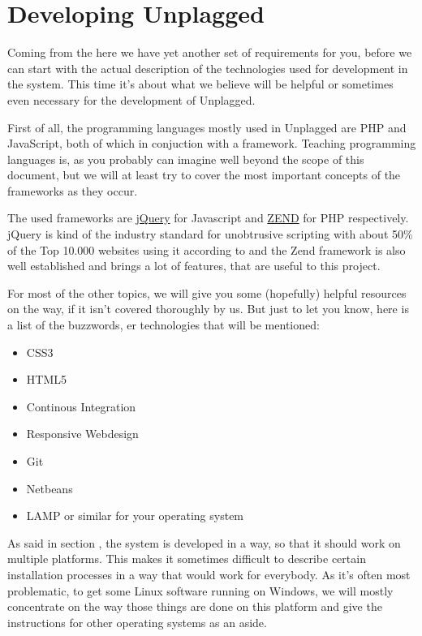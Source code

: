 \chapter{Developing Unplagged}\label{chap:developingUnplagged}

Coming from the  here we have yet another set of requirements for you, before we can
start with the actual description of the technologies used for development in the system. This time it's 
about what we believe will be helpful or sometimes even necessary for the development of Unplagged. 

First of all, the programming languages mostly used in Unplagged are PHP and JavaScript, both of which in conjuction
with a framework. Teaching programming languages is, as you probably can imagine well beyond the scope of this document,
but we will at least try to cover the most important concepts of the frameworks as they occur. 

The used frameworks are 
\href{http://jquery.com/}{jQuery} for Javascript and \href{http://framework.zend.com/docs/overview}{ZEND} for PHP 
respectively. jQuery is kind of the industry standard for unobtrusive scripting with about 50\% 
of the Top 10.000 websites using it according to \citet*{Trends} and the Zend framework is also well established and
brings a lot of features, that are useful to this project.

For most of the other topics, we will give you some (hopefully) helpful resources on the way, if it isn't covered 
thoroughly by us. But just to let you
know, here is a list of the buzzwords, er technologies that will be mentioned:

\begin{itemize}
\item CSS3
\item HTML5
\item Continous Integration
\item Responsive Webdesign
\item Git
\item Netbeans
\item LAMP or similar for your operating system
\end{itemize}

As said in section , the system is developed in a way, so that it should work on multiple platforms. 
This makes it sometimes difficult to describe certain installation processes in a way that would work for everybody. As
it's often most problematic, to get some Linux software running on Windows, we will mostly concentrate on the way those
things are done on this platform and give the instructions for other operating systems as an aside.

